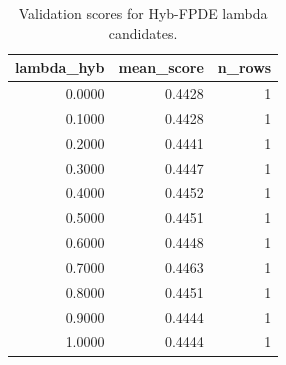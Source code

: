 \begin{table}[t]
\caption{Validation scores for Hyb-FPDE lambda candidates.}
\label{tab:lambda_distribution_computed}
\centering
\begin{tabular}{rrr}
\toprule
lambda\_hyb & mean\_score & n\_rows \\
\midrule
0.0000 & 0.4428 & 1 \\
0.1000 & 0.4428 & 1 \\
0.2000 & 0.4441 & 1 \\
0.3000 & 0.4447 & 1 \\
0.4000 & 0.4452 & 1 \\
0.5000 & 0.4451 & 1 \\
0.6000 & 0.4448 & 1 \\
0.7000 & 0.4463 & 1 \\
0.8000 & 0.4451 & 1 \\
0.9000 & 0.4444 & 1 \\
1.0000 & 0.4444 & 1 \\
\bottomrule
\end{tabular}

\end{table}
